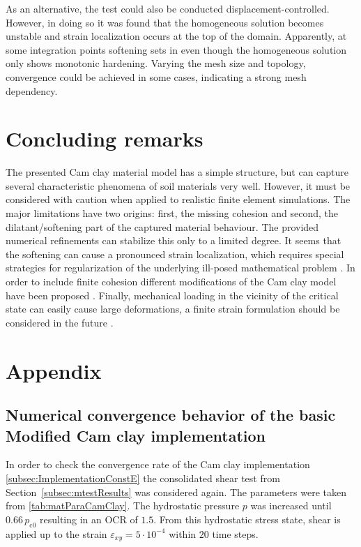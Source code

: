 \documentclass[paper=a4, twoside, pagesize]{scrartcl}
\renewcommand{\c}{\text{c}}
\begin{document}
As an alternative, the test could also be conducted displacement-controlled. However, in doing so it was found that the homogeneous solution becomes unstable and strain localization occurs at the top of the domain. Apparently, at some integration points softening sets in even though the homogeneous solution only shows monotonic hardening. Varying the mesh size and topology, convergence could be achieved in some cases, indicating a strong mesh dependency.

\section{Concluding remarks}

The presented Cam clay material model has a simple structure, but can capture several characteristic phenomena of soil materials very well. However, it must be considered with caution when applied to realistic finite element simulations. The major limitations have two origins: first, the missing cohesion and second, the dilatant/softening part of the captured material behaviour. The provided numerical refinements can stabilize this only to a limited degree. It seems that the softening can cause a pronounced strain localization, which requires special strategies for regularization of the underlying ill-posed mathematical problem \cite[cf. e.\,g.][]{Manica2018}. In order to include finite cohesion different modifications of the Cam clay model have been proposed \cite[cf. e.\,g.][]{Gaume2018}. Finally, mechanical loading in the vicinity of the critical state can easily cause large deformations, a finite strain formulation should be considered in the future \cite[cf. e.\,g.][]{Borja1998,Callari1998}.


\appendix

\section{Appendix}

\subsection{Numerical convergence behavior of the basic Modified Cam clay implementation}
\label{subsec:AppConvergence}

In order to check the convergence rate of the Cam clay implementation \ref{subsec:ImplementationConstE} the consolidated shear test from Section~\ref{subsec:mtestResults} was considered again. The parameters were taken from \autoref{tab:matParaCamClay}. The hydrostatic pressure $p$ was increased until $0.66\,p_{\c0}$ resulting in an OCR of $1.5$. From this hydrostatic stress state, shear is applied up to the strain $\varepsilon_{xy}=5\cdot10^{-4}$ within $20$ time steps.
\end{document}

